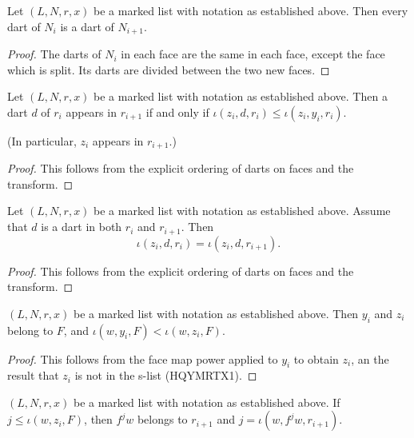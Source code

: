 \begin{lemma}
  Let $(L,N,r,x)$ be a marked list with notation as established above.
Then every dart of $N_i$ is a dart of $N_{i+1}$.
\end{lemma}

\begin{proof} The darts of $N_i$ in each face are the same in each face, except the face which is split.
Its darts are divided between the two new faces.
\end{proof}

\begin{lemma} 
Let $(L,N,r,x)$ be a marked list with notation as established above.
Then a dart $d$ of $r_i$ appears in $r_{i+1}$ if and only if $\iota(z_i,d,r_i)\le \iota(z_i,y_i,r_i)$.
\end{lemma}

(In particular, $z_i$ appears in $r_{i+1}$.)

\begin{proof} This follows from the explicit ordering of darts on faces and the transform.
\end{proof}


\begin{lemma}
Let $(L,N,r,x)$ be a marked list with notation as established above.
Assume that $d$ is a dart in both $r_i$ and $r_{i+1}$.  Then 
\[
\iota(z_i,d,r_i) = \iota(z_i,d,r_{i+1}).
\]
\end{lemma}

\begin{proof} This follows from the explicit ordering of darts on faces and the transform.
\end{proof}

\begin{lemma}
$(L,N,r,x)$ be a marked list with notation as established above.
Then $y_i$ and $z_i$ belong to $F$, and
 $\iota(w,y_i,F) < \iota(w,z_i,F)$.
\end{lemma}

\begin{proof} This follows from the face map power applied to $y_i$ to obtain $z_i$,
an the result that $z_i$ is not in the s-list (HQYMRTX1).
\end{proof}

\begin{lemma}
$(L,N,r,x)$ be a marked list with notation as established above.
If $j\le \iota(w,z_i,F)$, then $f^jw$ belongs to $r_{i+1}$ and
$j = \iota(w,f^j w,r_{i+1})$.
\end{lemma}

